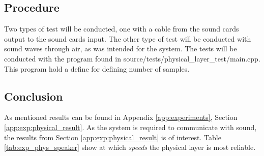 	\subsection{Procedure}
	Two types of test will be conducted, one with a cable from the sound cards output to the sound cards input. The other type of test will be conducted with sound waves through air, as was intended for the system.
	The tests will be conducted with the program found in source/tests/physical\_layer\_test/main.cpp. This program hold a define for defining number of samples.
	
	\subsection{Conclusion}
	As mentioned results can be found in Appendix \ref{app:experiments}, Section \ref{app:exp:physical_result}. As the system is required to communicate with sound, the results from Section \ref{app:exp:physical_result} is of interest. Table \ref{tab:exp_phys_speaker} show at which \textit{speeds} the physical layer is most reliable.